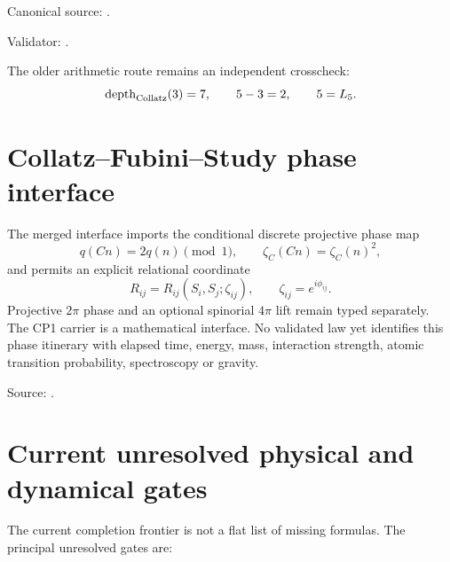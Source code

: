 Canonical source:
.

Validator:
.

The older arithmetic route remains an independent crosscheck:
\[
\operatorname{depth}_{\rm Collatz}(3)=7,
\qquad 5-3=2,
\qquad 5=L_5.
\]

\section{Collatz--Fubini--Study phase interface}

The merged interface imports the conditional discrete projective phase map
\[
q(Cn)=2q(n)\pmod1,
\qquad
\boxed{\zeta_C(Cn)=\zeta_C(n)^2},
\]
and permits an explicit relational coordinate
\[
R_{ij}=R_{ij}(S_i,S_j;\zeta_{ij}),
\qquad \zeta_{ij}=e^{i\phi_{ij}}.
\]
Projective \(2\pi\) phase and an optional spinorial \(4\pi\) lift remain typed
separately.  The CP1 carrier is a mathematical interface.  No validated law yet
identifies this phase itinerary with elapsed time, energy, mass, interaction
strength, atomic transition probability, spectroscopy or gravity.

Source:
.

\section{Current unresolved physical and dynamical gates}

The current completion frontier is not a flat list of missing formulas.  The
principal unresolved gates are:

